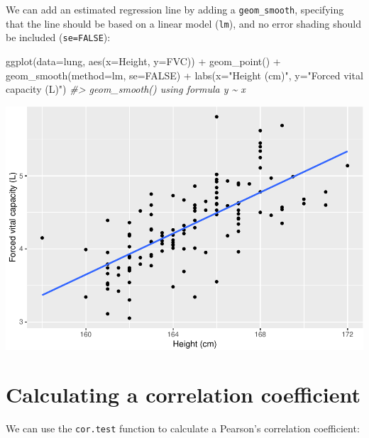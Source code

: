 \documentclass[
]{memoir}
\newenvironment{Shaded}{\begin{snugshade}}{\end{snugshade}}
\newcommand{\AttributeTok}[1]{\textcolor[rgb]{0.77,0.63,0.00}{#1}}
\newcommand{\CommentTok}[1]{\textcolor[rgb]{0.56,0.35,0.01}{\textit{#1}}}
\newcommand{\ConstantTok}[1]{\textcolor[rgb]{0.00,0.00,0.00}{#1}}
\newcommand{\FunctionTok}[1]{\textcolor[rgb]{0.00,0.00,0.00}{#1}}
\newcommand{\NormalTok}[1]{#1}
\newcommand{\SpecialCharTok}[1]{\textcolor[rgb]{0.00,0.00,0.00}{#1}}
\newcommand{\StringTok}[1]{\textcolor[rgb]{0.31,0.60,0.02}{#1}}
\begin{document}
We can add an estimated regression line by adding a \texttt{geom\_smooth}, specifying that the line should be based on a linear model (\texttt{lm}), and no error shading should be included (\texttt{se=FALSE}):

\begin{Shaded}
\begin{Highlighting}[]
\FunctionTok{ggplot}\NormalTok{(}\AttributeTok{data=}\NormalTok{lung, }\FunctionTok{aes}\NormalTok{(}\AttributeTok{x=}\NormalTok{Height, }\AttributeTok{y=}\NormalTok{FVC)) }\SpecialCharTok{+} 
  \FunctionTok{geom\_point}\NormalTok{() }\SpecialCharTok{+}
  \FunctionTok{geom\_smooth}\NormalTok{(}\AttributeTok{method=}\NormalTok{lm, }\AttributeTok{se=}\ConstantTok{FALSE}\NormalTok{) }\SpecialCharTok{+}
  \FunctionTok{labs}\NormalTok{(}\AttributeTok{x=}\StringTok{"Height (cm)"}\NormalTok{, }\AttributeTok{y=}\StringTok{"Forced vital capacity (L)"}\NormalTok{)}
\CommentTok{\#\textgreater{} \textasciigrave{}geom\_smooth()\textasciigrave{} using formula \textquotesingle{}y \textasciitilde{} x\textquotesingle{}}
\end{Highlighting}
\end{Shaded}

\includegraphics{08.1-correlation-regression-R_files/figure-latex/unnamed-chunk-5-1.pdf}

\hypertarget{calculating-a-correlation-coefficient}{%
\section{Calculating a correlation coefficient}\label{calculating-a-correlation-coefficient}}

We can use the \texttt{cor.test} function to calculate a Pearson's correlation coefficient:
\end{document}
